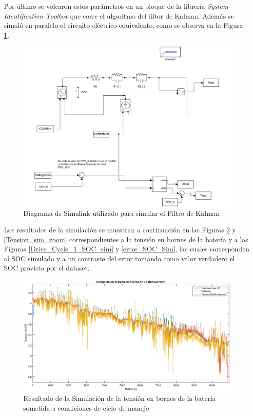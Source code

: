 \documentclass[10pt,a4paper]{article}
\begin{document}
	Por último se volcaron estos parámetros en un bloque de la librería \emph{System Identification Toolbox} que corre el algoritmo del filtor de Kalman. Además se simuló en paralelo el circuito eléctrico equivalente, como se observa en la Figura \ref{simulink_diagram}.
	\begin{figure}[h!]
		\begin{center}
			\includegraphics[width=1\textwidth]{simulink.pdf}
			\caption{Diagrama de Simulink utilizado para simular el Filtro de Kalman}
			\label{simulink_diagram}
		\end{center}
	\end{figure}
	
	\clearpage
	
	Los resultados de la simulación se muestran a continuación en las Figuras \ref{Tension_sim} y \ref{Tension_sim_zoom} correspondientes a la tensión en bornes de la batería y  a las Figuras \ref{Drive_Cycle_1_SOC_sim} y \ref{error_SOC_Sim}, las cuales corresponden al SOC simulado y a un contraste del error tomando como valor verdadero el SOC provisto por el dataset.
	
	\begin{figure}[h!]
		\begin{center}
			\includegraphics[width=1\textwidth]{Tension_Sim.eps}
			\caption{Resultado de la Simulación de la tensión en bornes de la batería sometida a condiciones de ciclo de manejo}
			\label{Tension_sim}
		\end{center}
	\end{figure}
	
\end{document}
